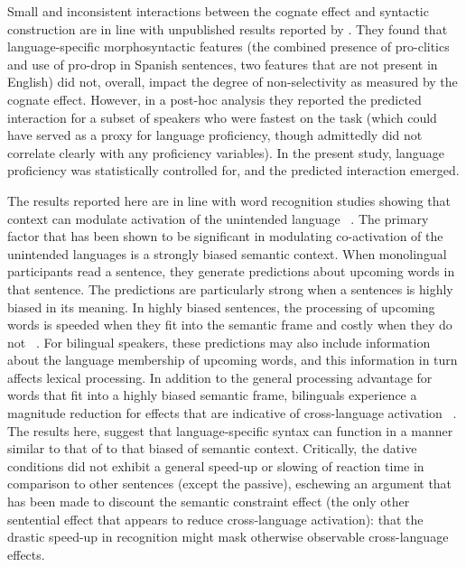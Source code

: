 Small and inconsistent interactions between the cognate effect and syntactic construction are in line with unpublished results reported by  \citet{Gullifer2013}. They found that language-specific morphosyntactic features (the combined presence of pro-clitics and use of pro-drop in Spanish sentences, two features that are not present in English) did not, overall, impact the degree of non-selectivity as measured by the cognate effect. However, in a post-hoc analysis they reported the predicted interaction for a subset of speakers who were fastest on the task (which could have served as a proxy for language proficiency, though admittedly did not correlate clearly with any proficiency variables). In the present study, language proficiency was statistically controlled for, and the predicted interaction emerged. 

The results reported here are in line with word recognition studies showing that context can modulate activation of the unintended language ~\citep[e.g.,][]{Schwartz2006,Libben2009}. The primary factor that has been shown to be significant in modulating co-activation of the unintended languages is a strongly biased semantic context. When monolingual participants read a sentence, they generate predictions about upcoming words in that sentence. The predictions are particularly strong when a sentences is highly biased in its meaning. In highly biased sentences, the processing of upcoming words is speeded when they fit into the semantic frame and costly when they do not ~\citep{Duffy2001,Schwanenflugel1988}. For bilingual speakers, these predictions may also include information about the language membership of upcoming words, and this information in turn affects lexical processing. In addition to the general processing advantage for words that fit into a highly biased semantic frame, bilinguals experience a magnitude reduction for effects that are indicative of cross-language activation ~\citep{Schwartz2006}. The results here, suggest that language-specific syntax can function in a manner similar to that of to that biased of semantic context. Critically, the dative conditions did not exhibit a general speed-up or slowing of reaction time in comparison to other sentences (except the passive), eschewing an argument that has been made to discount the semantic constraint effect (the only other sentential effect that appears to reduce cross-language activation): that the drastic speed-up in recognition might mask otherwise observable cross-language effects. 

